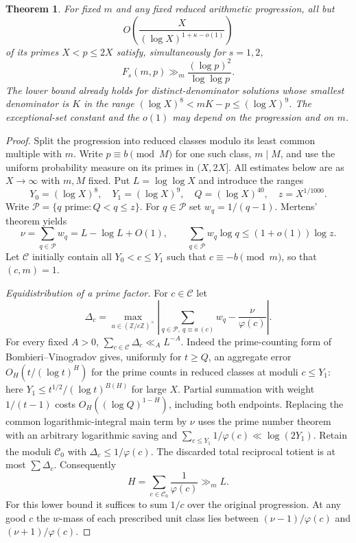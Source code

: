 \documentclass[a4paper,11pt]{article}
\newtheorem{theorem}{Theorem}[section]
\begin{document}
\begin{theorem}\label{thm:two-types}
For fixed $m$ and any fixed reduced arithmetic progression, all but
\[
 O\!\left(\frac{X}{(\log X)^{1+\kappa-o(1)}}\right)
\]
of its primes $X<p\le2X$ satisfy, simultaneously for $s=1,2$,
\[
 F_s(m,p)\gg_m\frac{(\log p)^2}{\log\log p}.
\]
The lower bound already holds for distinct-denominator solutions whose smallest denominator is
$K$ in the range $(\log X)^8<mK-p\le(\log X)^9$.
The exceptional-set constant and the $o(1)$ may depend on the progression
and on $m$.
\end{theorem}

\begin{proof}
Split the progression into reduced classes modulo its least common
multiple with $m$. Write $p\equiv b\pmod M$ for one such class,
$m\mid M$, and use the uniform probability measure on its primes in
$(X,2X]$. All estimates below are as $X\to\infty$ with $m,M$ fixed.
Put $L=\log\log X$ and introduce the ranges
\[
 Y_0=(\log X)^8,\quad Y_1=(\log X)^9,\quad
 Q=(\log X)^{40},\quad z=X^{1/1000}.\]
Write \(
 \mathcal P=\{q\text{ prime}:Q<q\le z\}\).
For $q\in\mathcal P$ set $w_q=1/(q-1)$. Mertens' theorem yields
\[
 \nu=\sum_{q\in\mathcal P}w_q=L-\log L+O(1),\qquad
 \sum_{q\in\mathcal P}w_q\log q\le(1+o(1))\log z.
\]
Let $\mathcal C$ initially contain all $Y_0<c\le Y_1$ such that
$c\equiv-b\pmod m$, so that $(c,m)=1$.

\emph{Equidistribution of a prime factor.}
For $c\in\mathcal C$ let
\[
 \Delta_c=\max_{a\in(\mathbb Z/c\mathbb Z)^\times}
 \left|\sum_{q\in\mathcal P,\ q\equiv a\ (c)}w_q
           -\frac{\nu}{\varphi(c)}\right|.
\]
For every fixed $A>0$, $\sum_{c\in\mathcal C}\Delta_c\ll_A L^{-A}$.
Indeed the prime-counting form of Bombieri--Vinogradov \cite[Theorem 7.1]{harper} gives, uniformly for
$t\ge Q$, an aggregate error $O_H(t/(\log t)^H)$ for the prime counts
in reduced classes at moduli $c\le Y_1$: here
$Y_1\le t^{1/2}/(\log t)^{B(H)}$ for large $X$.
Partial summation with weight $1/(t-1)$ costs
$O_H((\log Q)^{1-H})$, including both endpoints. Replacing the common
logarithmic-integral main term by $\nu$ uses the prime number theorem
with an arbitrary logarithmic saving and
$\sum_{c\le Y_1}1/\varphi(c)\ll\log(2Y_1)$.
Retain the moduli $\mathcal C_0$ with $\Delta_c\le1/\varphi(c)$.
The discarded total reciprocal totient is at most $\sum\Delta_c$.
Consequently
\begin{equation}\label{eq:goodc}
 H=\sum_{c\in\mathcal C_0}\frac1{\varphi(c)}\gg_m L .
\end{equation}
For this lower bound it suffices to sum $1/c$ over the original
progression. At any good $c$ the $w$-mass of each prescribed unit
class lies between $(\nu-1)/\varphi(c)$ and $(\nu+1)/\varphi(c)$.


\end{proof}
\end{document}
